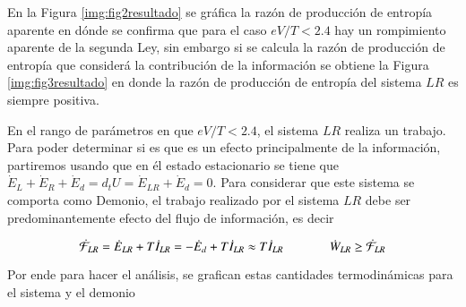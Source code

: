 
En la Figura \ref{img:fig2resultado} se gráfica la razón de producción de entropía aparente en dónde se confirma que para el caso $eV/T<2.4$ hay un rompimiento aparente de la segunda Ley, sin embargo si se calcula la razón de producción de entropía que considerá la contribución de la información se obtiene la Figura \ref{img:fig3resultado} en donde la razón de producción de entropía del sistema $LR$ es siempre positiva.


En el rango de parámetros en que $eV/T<2.4$, el sistema $LR$ realiza un trabajo. Para poder determinar si es que es un efecto principalmente de la información, partiremos usando que en él estado estacionario se tiene que $ \dot{E}_{L}+\dot{E}_{R}+\dot{E}_{d} = d_{t}U = \dot{E}_{LR} + \dot{E}_{d}=0$. Para considerar que este sistema se comporta como Demonio, el trabajo realizado por el sistema $LR$ debe ser predominantemente efecto del flujo de información, es decir

\begin{equation*}
    \dot{\mathcal{F}}_{LR} =  \dot{E}_{LR} + T\dot{I}_{LR} = -\dot{E}_{d} + T\dot{I}_{LR} \approx T\dot{I}_{LR}  \hspace{13mm} \dot{W}_{LR} \geq \dot{\mathcal{F}}_{LR}
\end{equation*}

Por ende para hacer el análisis, se grafican estas cantidades termodinámicas para el sistema y el demonio 


